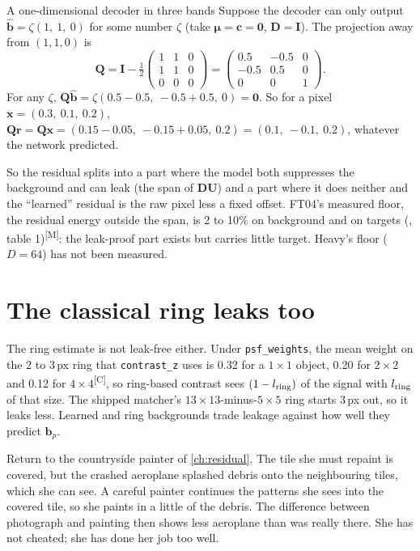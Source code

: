 \documentclass[11pt,a4paper,oneside,openany]{book}
\newcommand{\B}[1]{{\symbf{#1}}}
\newcommand{\B}[1]{{\bm{#1}}}
\newcommand{\meas}{\textsuperscript{\textsf{\scriptsize[M]}}}
\newcommand{\comp}{\textsuperscript{\textsf{\scriptsize[C]}}}
\newcommand{\vx}{\B{x}}
\newcommand{\vb}{\B{b}}
\newcommand{\vbh}{\hat{\B{b}}}
\newcommand{\vr}{\B{r}}
\newcommand{\vc}{\B{c}}
\newcommand{\vmu}{\B{\mu}}
\newcommand{\mU}{\B{U}}
\newcommand{\mD}{\B{D}}
\newcommand{\mI}{\B{I}}
\newcommand{\mQ}{\B{Q}}
\begin{document}
\begin{worked}[label=we:floor]{A one-dimensional decoder in three bands}
Suppose the decoder can only output $\vbh=\zeta(1,\ 1,\ 0)$ for some number $\zeta$ (take $\vmu=\vc=\B0$, $\mD=\mI$). The projection away from $(1,1,0)$ is
\[
  \mQ=\mI-\tfrac12\begin{pmatrix}1&1&0\\1&1&0\\0&0&0\end{pmatrix}=\begin{pmatrix}0.5&-0.5&0\\-0.5&0.5&0\\0&0&1\end{pmatrix}.
\]
For any $\zeta$, $\mQ\vbh=\zeta(0.5-0.5,\ -0.5+0.5,\ 0)=\B0$. So for a pixel $\vx=(0.3,\ 0.1,\ 0.2)$, $\mQ\vr=\mQ\vx=(0.15-0.05,\ -0.15+0.05,\ 0.2)=(0.1,\ -0.1,\ 0.2)$,
whatever the network predicted.
\end{worked}

So the residual splits into a part where the model both suppresses the background and can leak (the span of $\mD\mU$) and a part where it does neither and the
``learned'' residual is the raw pixel less a fixed offset. FT04's measured floor, the residual energy outside the span, is 2 to 10\% on background and on targets
(, table 1)\meas: the leak-proof part exists but carries little target. Heavy's floor ($D=64$) has not been measured.

\section{The classical ring leaks too}

The ring estimate is not leak-free either. Under \texttt{psf\_weights}, the mean weight on the 2 to 3\,px ring that \texttt{contrast\_z} uses is 0.32 for a $1\times1$
object, 0.20 for $2\times2$ and 0.12 for $4\times4$\comp, so ring-based contrast sees $(1-l_{\rm ring})$ of the signal with $l_{\rm ring}$ of that size. The shipped
matcher's $13\times13$-minus-$5\times5$ ring starts 3\,px out, so it leaks less. Learned and ring backgrounds trade leakage against how well they predict $\vb_p$.

\begin{analogy}
Return to the countryside painter of \cref{ch:residual}. The tile she must repaint is covered, but the crashed aeroplane splashed debris onto the neighbouring tiles,
which she can see. A careful painter continues the patterns she sees into the covered tile, so she paints in a little of the debris. The difference between photograph
and painting then shows less aeroplane than was really there. She has not cheated; she has done her job too well.
\end{analogy}
\end{document}
